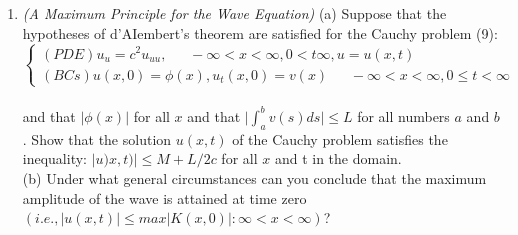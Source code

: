 \documentclass[../main.tex]{subfiles}
\begin{document}
{{\begin{enumerate}
$$\begin{cases} 
	(PDE) u_u=u_{xx}, ~~~~~~~ 0< x< \infty, 0<t \infty , u=u(x,t) \\ 
	(BCs)
	\begin{cases} 
	u(x,0)=\phi (x), u_t(x,0)=v(x)\\
	u(x,t)=0
	\end{cases}
	0<x<\infty, 0\leqslant t< \infty 
\end{cases}$$
(a)Making use of d'AIembert's formula and an appropriate "method of reflections" technique 
similar to that used in the text for the finite string, develop a program for solving this problem. 
We point out that such a method will not be a numerical method, per se, since it will simply use 
the computer to perform analytical computations (and the only errors are due to roundoff). 
\\
(b) Obtain snapshots of profiles of the solution to the above problem using the following initial conditions:
$\phi(x)=
\begin{cases}
	sin(x) for~~ 0\leqslant x \leqslant2 \pi\\
	0, ~~~~~~~otherwise
\end{cases},
	v(x)=0, c=1$
(c) Obtain snapshots of profiles of the solution to the above problem using the following initial 
conditions:
$$\phi(x)=
\begin{cases}
	sin(x) for~~ 0\leqslant x \leqslant2 \pi\\
	0, ~~~~~~~otherwise
\end{cases},
	v(x)=0
	 \begin{cases}
	 	1,~~for ~~~6\pi \leqslant x 8\pi
	 	0,~~~~~~~otherwise
	 \end{cases}
	 	L=10\pi$$
(d) Create a MATLAB movie of the propagation of the wave in part (b). 
\\
(e) Create a MATLAB movie of the propagation of the wave in part (c).
\\
	\item
		\textit{(A Maximum Principle for the Wave Equation)} (a) Suppose that the hypotheses of d'AIembert's 
theorem are satisfied for the Cauchy problem (9): 
$$\begin{cases} 
	(PDE) u_u=c^2 u_{uu}, ~~~~~~~ - \infty< x< \infty, 0<t \infty , u=u(x,t) \\ 
	(BCs) u(x,0)=\phi (x), u_t(x,0)=v(x) ~~~~~~~
	-\infty< x< \infty, 0\leqslant t< \infty
\end{cases}$$
\\
and that $\vert \phi(x) \vert$  for all $x$ and that $\vert \int_{a}^{b} v(s)ds \vert \leqslant L$ for all numbers $a$ and $b$. Show that the solution $u(x,t)$ of the Cauchy problem satisfies the inequality: $\vert u)x,t) \vert \leqslant M+L/2c$  for all $x$ and t in the domain. 
\\
(b) Under what general circumstances can you conclude that the maximum amplitude of the wave is attained at time zero
$(i.e., \vert u(x,t)\vert \leqslant max{\vert K(x,0) \vert: \infty < x < \infty} )$?
\end{enumerate}
}}
\end{document}
